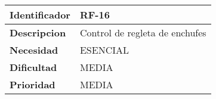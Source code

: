\begin{center}
    \begin{tabular}{|p{2.6cm}|p{12cm}|}
    \hline
    \textbf{Identificador} & RF-16\\
    \hline
    \textbf{Descripcion} & Control de regleta de enchufes\\
    \hline
    \textbf{Necesidad} & ESENCIAL\\
    \hline
    \textbf{Dificultad} & MEDIA\\
    \hline
    \textbf{Prioridad} & MEDIA\\
    \hline
    \end{tabular}
\end{center}
